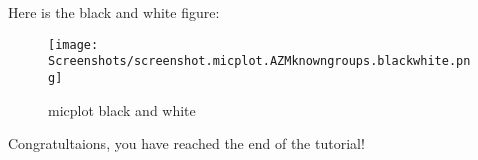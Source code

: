 \documentclass[11pt]{article}
\begin{document}
    Here is the black and white figure:

    \begin{figure}
\centering
\texttt{[image: Screenshots/screenshot.micplot.AZMknowngroups.blackwhite.png]}
\caption{micplot black and white}
\end{figure}

    Congratultaions, you have reached the end of the tutorial!


\end{document}
